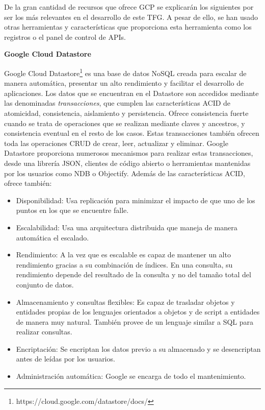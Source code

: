 De la gran cantidad de recursos que ofrece \acs{GCP} se explicarán los siguientes por ser los más relevantes en el desarrollo de este \ac{TFG}. A pesar de ello, se han usado otras herramientas y características que proporciona esta herramienta como los registros o el panel de control de \acs{API}s.


\textbf{Google Cloud Datastore}

Google Cloud Datastore\footnote{https://cloud.google.com/datastore/docs/} es una base de datos NoSQL creada para escalar de manera automática, presentar un alto rendimiento y facilitar el desarrollo de aplicaciones. Los datos que se encuentran en el Datastore son accedidos mediante las denominadas \textit{transacciones}, que cumplen las características \acs{ACID} de atomicidad, consistencia, aislamiento y persistencia. Ofrece consistencia fuerte cuando se trata de operaciones que se realizan mediante claves y ancestros, y consistencia eventual en el resto de los casos. Estas transacciones también ofrecen toda las operaciones \acs{CRUD} de crear, leer, actualizar y eliminar. Google Datastore proporciona numerosos mecanismos para realizar estas transacciones, desde una librería JSON, clientes de código abierto o herramientas mantenidas por los usuarios como NDB o Objectify. Además de las características \acs{ACID}, ofrece también:

\begin{itemize}
\item Disponibilidad: Usa replicación para minimizar el impacto de que uno de los puntos en los que se encuentre falle.
\item Escalabilidad: Usa una arquitectura distribuida que maneja de manera automática el escalado.
\item Rendimiento: A la vez que es escalable es capaz de mantener un alto rendimiento gracias a su combinación de índices. En una consulta, su rendimiento depende del resultado de la consulta y no del tamaño total del conjunto de datos.
\item Almacenamiento y consultas flexibles: Es capaz de trasladar objetos y entidades propias de los lenguajes orientados a objetos y de script a entidades de manera muy natural. También provee de un lenguaje similar a SQL para realizar consultas.
\item Encriptación: Se encriptan los datos previo a su almacenado y se desencriptan antes de leídas por los usuarios.
\item Administración automática: Google se encarga de todo el mantenimiento.
\end{itemize} 

